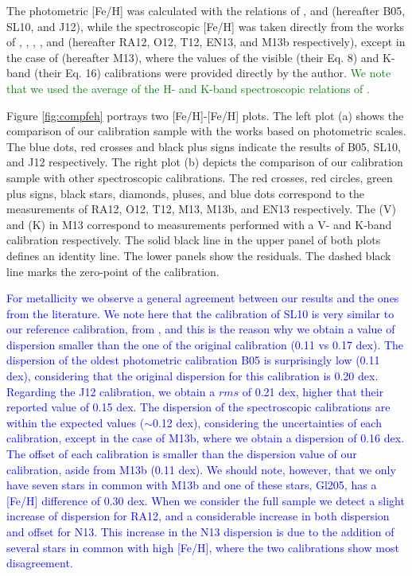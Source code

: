 \documentclass{aa}
\begin{document}
The photometric [Fe/H] was calculated with the relations of \citet{Bonfils-2005}, \citet{Schlaufman-2010} and \citet{Johnson-2012} (hereafter B05, SL10, and J12), while the spectroscopic [Fe/H] was taken directly from the works of  \citet{Rojas-Ayala-2012}, \citet{Onehag-2012}, \citet{Terrien-2012}, \citet{Newton-2013}, and \citet{Mann-2013b} (hereafter RA12, O12, T12, EN13, and M13b respectively), except in the case of \citet{Mann-2013a} (hereafter M13), where the values of the visible (their Eq. 8) and K-band (their Eq. 16) calibrations were provided directly by the author. \textcolor{green}{We note that we used the average of the H- and K-band spectroscopic relations of \citet{Terrien-2012}.} 

Figure \ref{fig:compfeh} portrays two [Fe/H]-[Fe/H] plots. The left plot (a) shows the comparison of our calibration sample with the works based on photometric scales. The blue dots, red crosses and black plus signs indicate the results of B05, SL10, and J12 respectively. The right plot (b) depicts the comparison of our calibration sample with other spectroscopic calibrations. The red crosses, red circles, green plus signs, black stars, diamonds, pluses, and blue dots correspond to the measurements of RA12, O12, T12, M13, M13b, and EN13 respectively. The (V) and (K) in M13 correspond to measurements performed with a V- and K-band calibration respectively. The solid black line in the upper panel of both plots defines an identity line. The lower panels show the residuals. The dashed black line marks the zero-point of the calibration.

\textcolor{blue}{For metallicity we observe a general agreement between our results and the ones from the literature. We note here that the calibration of SL10 is very similar to our reference calibration, from \citet{Neves-2012}, and this is the reason why we obtain a value of dispersion smaller than the one of the original calibration (0.11 vs 0.17 dex). The dispersion of the oldest photometric calibration B05 is surprisingly low (0.11 dex), considering that the original dispersion for this calibration is 0.20 dex. Regarding the J12 calibration, we obtain a $rms$ of 0.21 dex, higher that their reported value of 0.15 dex. The dispersion of the spectroscopic calibrations are within the expected values ($\sim$0.12 dex), considering the uncertainties of each calibration, except in the case of M13b, where we obtain a dispersion of 0.16 dex. The offset of each calibration is smaller than the dispersion value of our calibration, aside from M13b (0.11 dex). We should note, however, that we only have seven stars in common with M13b and one of these stars, Gl205, has a [Fe/H] difference of 0.30 dex. When we consider the full sample we detect a slight increase of dispersion for RA12, and a considerable increase in both dispersion and offset for N13. This increase in the N13 dispersion is due to the addition of several stars in common with high [Fe/H], where the two calibrations show most disagreement.}  %
\end{document}
